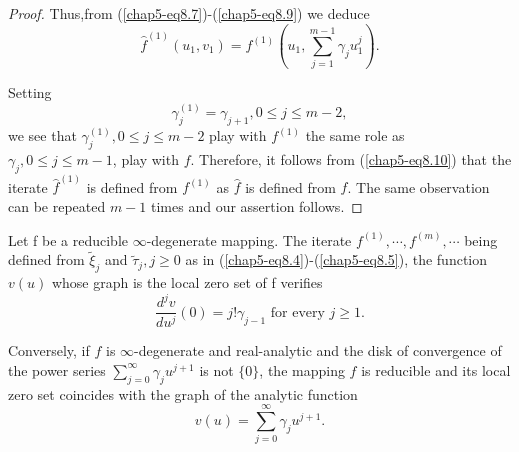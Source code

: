 \begin{proof}
Thus,\pageoriginale from (\ref{chap5-eq8.7})-(\ref{chap5-eq8.9}) we
deduce
\begin{equation*}
\hat{f}^{(1)} (u_{1}, v_{1}) = f^{(1)} \left(u_{1}, \sum\limits_{j=1}^{m-1}
\gamma_{j} u_{1}^{j} \right).\tag{8.10}\label{chap5-eq8.10}
\end{equation*}

Setting 
$$
\gamma_{j}^{(1)} = \gamma_{j+1}, 0 \leq j \leq m-2,
$$
we see that $\gamma_{j}^{(1)}, 0 \leq j \leq m-2$ play with $f^{(1)}$
the same role as $\gamma_{j}, 0 \leq j \leq m-1$, play with
$f$. Therefore, it follows from (\ref{chap5-eq8.10}) that the iterate
$\hat{f}^{(1)}$ is defined from $f^{(1)}$ as $\hat{f}$ is defined from
$f$. The same observation can be repeated $m - 1$ times and our
assertion follows.  
\end{proof}

\begin{theorem}\label{chap5-thm8.1}
Let f be a reducible $\infty$-degenerate mapping. The iterate
$f^{(1)}, \cdots, f^{(m)}, \cdots$ being defined from
$\widetilde{\xi}_{j}$ and $\widetilde{\tau}_{j}, j \geq 0$ as in
(\ref{chap5-eq8.4})-(\ref{chap5-eq8.5}), the function $v(u)$ whose
graph is the local zero set of f verifies
\begin{equation*}
\frac{d^{j} v}{d u^{j}} (0) = j! \gamma_{j-1} \text{ for every } j
\geq 1.\tag{8.11}\label{chap5-eq8.11}
\end{equation*}

Conversely, if $f$ is $\infty$-degenerate and real-analytic and the disk
of convergence of the power series $\sum\limits_{j=0}^{\infty}
\gamma_{j} u^{j+1}$ is not $\{0\}$, the mapping $f$ is reducible and its
local zero set coincides with the graph of the analytic function
\begin{equation*}
v(u) = \sum\limits_{j=0}^{\infty} \gamma_{j}
u^{j+1}.\tag{8.12}\label{chap5-eq8.12} 
\end{equation*}
\end{theorem}

